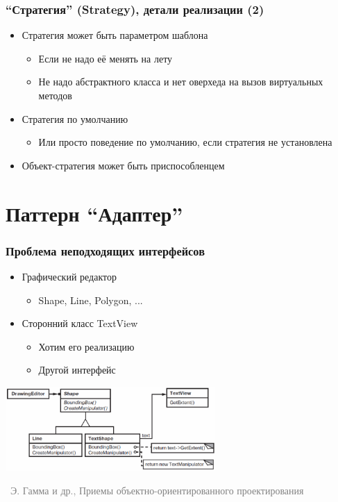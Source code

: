 \documentclass[xetex,mathserif,serif]{beamer}
\newcommand{\attribution}[1] {
	\vspace{-5mm}\begin{flushright}\begin{scriptsize}\textcolor{gray}{\textcopyright\, #1}\end{scriptsize}\end{flushright}
}
\begin{document}
	\begin{frame}
		\frametitle{``Стратегия'' (Strategy), детали реализации (2)}
		\begin{itemize}
			\item Стратегия может быть параметром шаблона
			\begin{itemize}
				\item Если не надо её менять на лету
				\item Не надо абстрактного класса и нет оверхеда на вызов виртуальных методов
			\end{itemize}
			\item Стратегия по умолчанию
			\begin{itemize}
				\item Или просто поведение по умолчанию, если стратегия не установлена
			\end{itemize}
			\item Объект-стратегия может быть приспособленцем
		\end{itemize}
	\end{frame}

	\section{Паттерн ``Адаптер''}

	\begin{frame}
		\frametitle{Проблема неподходящих интерфейсов}
		\begin{itemize}
			\item Графический редактор
			\begin{itemize}
				\item Shape, Line, Polygon, ...
			\end{itemize}
			\item Сторонний класс TextView
			\begin{itemize}
				\item Хотим его реализацию
				\item Другой интерфейс
			\end{itemize}
		\end{itemize}
		\vspace{2mm}
		\begin{center}
			\includegraphics[width=0.6\textwidth]{adapterExample.png}
			\attribution{Э. Гамма и др., Приемы объектно-ориентированного проектирования}
		\end{center}
	\end{frame}
\end{document}
